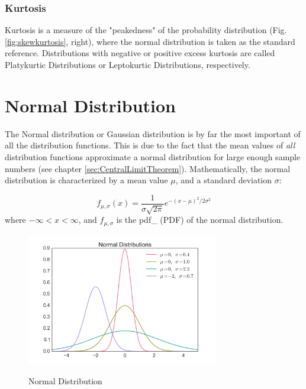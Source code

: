 \subsubsection{Kurtosis}

Kurtosis is a measure of the "peakedness" of the probability distribution (Fig. \ref{fig:skewkurtosis}, right), where the normal distribution is taken as the standard reference. Distributions with negative or positive excess kurtosis are called Platykurtic Distributions or Leptokurtic Distributions, respectively.

\section{Normal Distribution} \label{sec:normalDistribution}

The Normal distribution or Gaussian distribution is by far the most important of all the distribution functions. This is due to the fact that the mean values of \emph{all} distribution functions approximate a normal distribution for large enough sample numbers (see chapter \ref{sec:CentralLimitTheorem}).
Mathematically, the normal distribution is characterized by a mean value $\mu$, and a standard deviation $\sigma$:

\begin{equation}\label{eq_normal}
     f_{\mu,\sigma} (x) = \frac{1}{\sigma \sqrt{2 \pi}} e^{-( x - \mu )^2 /2 \sigma^2}
\end{equation}
where $ - \infty < x < \infty $, and $f_{\mu,\sigma}$ is the \gls{pdf_} (PDF)  of the normal distribution.

\begin{figure}
  \centering
  \includegraphics[width=0.75\textwidth]{../Images/Normal_Distribution_PDF.png}\\
  \caption{Normal Distribution}\label{fig:normal}
\end{figure}

